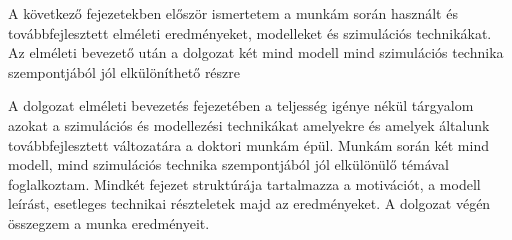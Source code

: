 A következő fejezetekben először ismertetem a munkám során használt és továbbfejlesztett elméleti eredményeket, modelleket és szimulációs technikákat. Az elméleti bevezető után a dolgozat két mind modell mind szimulációs technika szempontjából jól elkülöníthető részre 

A dolgozat elméleti bevezetés fejezetében a teljesség igénye nékül tárgyalom azokat a szimulációs és modellezési technikákat amelyekre és amelyek általunk továbbfejlesztett változatára a doktori munkám épül. Munkám során két mind modell, mind szimulációs technika szempontjából jól elkülönülő témával foglalkoztam. Mindkét fejezet struktúrája tartalmazza a motivációt, a modell leírást, esetleges technikai részteletek majd az eredményeket. 
A dolgozat végén összegzem a munka eredményeit.